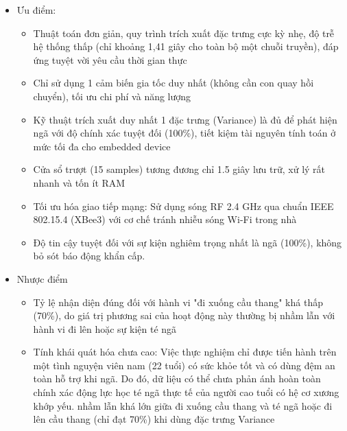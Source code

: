 \documentclass[../DoAn.tex]{subfiles}
\begin{document}
\begin{enumerate}[label=\arabic*)]
\begin{itemize}
\begin{itemize}
            \item Loại test: Thử nghiệm thực tế nhưng có đệm an toàn để tránh chấn thương cho người giả lập
            \item Điểm nổi bật về hiệu năng: Có khả năng phân loại hoàn hảo (100\%) cú ngã nguy hiểm chỉ bằng một đặc trưng duy nhất (Variance). Hệ thống giao tiếp không dây (XBee3) cực kỳ ổn định với tỷ lệ gửi nhận gói tin (Packet Delivery Ratio - PDR) đạt 100\% trong cả môi trường truyền thẳng (LoS) và có vật cản (NLoS)
        \end{itemize}
        \item Ưu điểm:
        \begin{itemize}
            \item Thuật toán đơn giản, quy trình trích xuất đặc trưng cực kỳ nhẹ, độ trễ hệ thống thấp (chỉ khoảng 1,41 giây cho toàn bộ một chuỗi truyền), đáp ứng tuyệt vời yêu cầu thời gian thực
            \item Chỉ sử dụng 1 cảm biến gia tốc duy nhất (không cần con quay hồi chuyển), tối ưu chi phí và năng lượng
            \item Kỹ thuật trích xuất duy nhất 1 đặc trưng (Variance) là đủ để phát hiện ngã với độ chính xác tuyệt đối (100\%), tiết kiệm tài nguyên tính toán ở mức tối đa cho embedded device
            \item Cửa sổ trượt (15 samples) tương đương chỉ 1.5 giây lưu trữ, xử lý rất nhanh và tốn ít RAM
            \item Tối ưu hóa giao tiếp mạng: Sử dụng sóng RF 2.4 GHz qua chuẩn IEEE 802.15.4 (XBee3) với cơ chế tránh nhiễu sóng Wi-Fi trong nhà
            \item Độ tin cậy tuyệt đối với sự kiện nghiêm trọng nhất là ngã (100\%), không bỏ sót báo động khẩn cấp.
        \end{itemize}
        \item Nhược điểm
        \begin{itemize}
            \item Tỷ lệ nhận diện đúng đối với hành vi "đi xuống cầu thang" khá thấp (70\%), do giá trị phương sai của hoạt động này thường bị nhầm lẫn với hành vi đi lên hoặc sự kiện té ngã
            \item Tính khái quát hóa chưa cao: Việc thực nghiệm chỉ được tiến hành trên một tình nguyện viên nam (22 tuổi) có sức khỏe tốt và có dùng đệm an toàn hỗ trợ khi ngã. Do đó, dữ liệu có thể chưa phản ánh hoàn toàn chính xác động lực học té ngã thực tế của người cao tuổi có hệ cơ xương khớp yếu.
             nhầm lẫn khá lớn giữa đi xuống cầu thang và té ngã hoặc đi lên cầu thang (chỉ đạt 70\%) khi dùng đặc trưng Variance

\end{itemize}
\end{itemize}
\end{enumerate}
\end{document}
